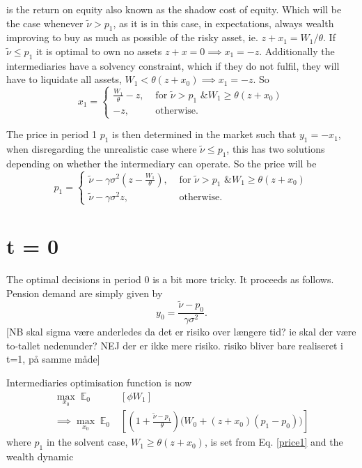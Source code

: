 \documentclass[11pt]{article}
\DeclareMathOperator{\E}{\mathbb{E}} %
\begin{document}
\begin{appendices}
is the return on equity also known as the shadow cost of equity. Which will be the case whenever $\tilde{\nu} > p_1$, as it is in this case, in expectations, always wealth improving to buy as much as possible of the risky asset, ie. $z + x_1 = W_1/\theta$. If $\tilde{\nu} \leq p_1$ it is optimal to own no assets $z+x = 0 \implies x_1 = -z$. Additionally the intermediaries have a solvency constraint, which if they do not fulfil, they will have to liquidate all assets, $W_1 < \theta(z+x_0) \implies x_1 = -z$. So
\begin{equation}
x_1 =
\begin{cases}
\frac{W_1}{\theta} - z, &\text{ for } \tilde{\nu} > p_1 \text{ \& } W_1 \geq \theta(z+x_0)\\
-z, &\text{ otherwise.}
\end{cases}
\end{equation}

The price in period 1 $p_1$ is then determined in the market such that $y_1 = - x_1$, when disregarding the unrealistic case where $\tilde{\nu} \leq p_1$, this has two solutions depending on whether the intermediary can operate. So the price will be
\begin{equation} \label{price1}
p_1 =
\begin{cases}
\tilde{\nu} - \gamma \sigma^2(z - \frac{W_1}{\theta}), &\text{ for } \tilde{\nu} > p_1 \text{ \& } W_1 \geq \theta(z+x_0)\\
\tilde{\nu} - \gamma \sigma^2 z, &\text{ otherwise}.
\end{cases}
\end{equation}

\section*{t = 0}

The optimal decisions in period 0 is a bit more tricky. It proceeds as follows. Pension demand are simply given by 
\begin{equation}
y_0 = \frac{\tilde{\nu} - p_0}{\gamma \sigma^2}.
\end{equation}
[NB skal sigma være anderledes da det er risiko over længere tid? ie skal der være to-tallet nedenunder? NEJ der er ikke mere risiko. risiko bliver bare realiseret i t=1, på samme måde]

Intermediaries optimisation function is now
\begin{equation}
\begin{split}
\max_{x_0} \E_0&[\phi W_1]\\
\implies \max_{x_0} \E_0&\left[\left(1 + \frac{\tilde{\nu} - p_1}{\theta}\right)\bigg(W_0 + \left(z+x_0\right)\left(p_1 - p_0\right) \bigg)  \right]
\end{split}
\end{equation}
where $p_1$ in the solvent case, $W_1 \geq \theta(z+x_0)$, is set from Eq. \ref{price1} and the wealth dynamic 


\end{appendices}
\end{document}
